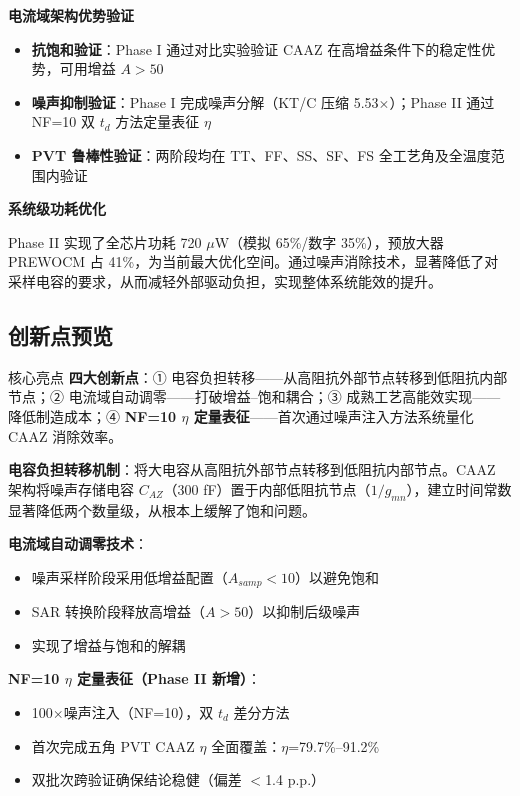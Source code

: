 \documentclass[11pt,a4paper,UTF8]{ctexart}
\begin{document}
\textbf{电流域架构优势验证}
\begin{itemize}
  \item \textbf{抗饱和验证}：Phase I 通过对比实验验证 CAAZ 在高增益条件下的稳定性优势，可用增益 $A > 50$
  \item \textbf{噪声抑制验证}：Phase I 完成噪声分解（KT/C 压缩 5.53$\times$）；Phase II 通过 NF=10 双 $t_d$ 方法定量表征 $\eta$
  \item \textbf{PVT 鲁棒性验证}：两阶段均在 TT、FF、SS、SF、FS 全工艺角及全温度范围内验证
\end{itemize}

\textbf{系统级功耗优化}

Phase II 实现了全芯片功耗 720 $\mu$W（模拟 65\%/数字 35\%），预放大器 PREWOCM 占 41\%，为当前最大优化空间。通过噪声消除技术，显著降低了对采样电容的要求，从而减轻外部驱动负担，实现整体系统能效的提升。

\subsection{创新点预览}

\begin{findbox}{核心亮点}
\textbf{四大创新点}：① 电容负担转移——从高阻抗外部节点转移到低阻抗内部节点；② 电流域自动调零——打破增益--饱和耦合；③ 成熟工艺高能效实现——降低制造成本；④ \textbf{NF=10 $\eta$ 定量表征}——首次通过噪声注入方法系统量化 CAAZ 消除效率。
\end{findbox}

\textbf{电容负担转移机制}：将大电容从高阻抗外部节点转移到低阻抗内部节点。CAAZ 架构将噪声存储电容 $C_{AZ}$（300 fF）置于内部低阻抗节点（$1/g_{mn}$），建立时间常数显著降低两个数量级，从根本上缓解了饱和问题。

\textbf{电流域自动调零技术}：
\begin{itemize}
  \item 噪声采样阶段采用低增益配置（$A_{samp} < 10$）以避免饱和
  \item SAR 转换阶段释放高增益（$A > 50$）以抑制后级噪声
  \item 实现了增益与饱和的解耦
\end{itemize}

\textbf{NF=10 $\eta$ 定量表征（Phase II 新增）}：
\begin{itemize}
  \item 100$\times$噪声注入（NF=10），双 $t_d$ 差分方法
  \item 首次完成五角 PVT CAAZ $\eta$ 全面覆盖：$\eta$=79.7\%--91.2\%
  \item 双批次跨验证确保结论稳健（偏差 $<$1.4 p.p.）
\end{itemize}
\end{document}
